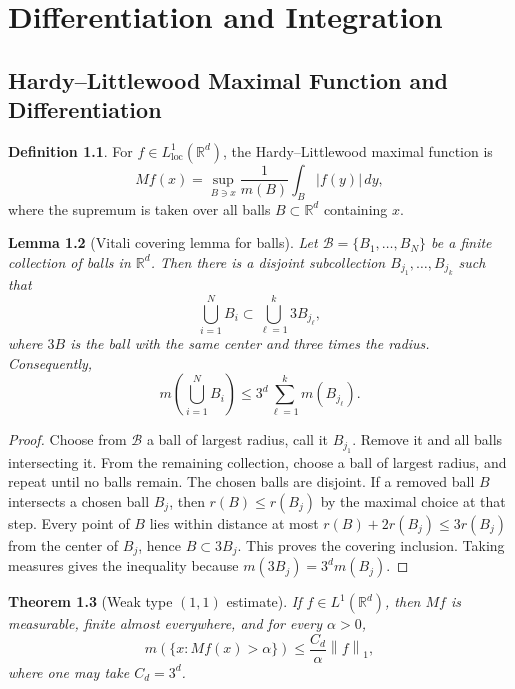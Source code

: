 \documentclass[11pt,openany]{book}
\numberwithin{equation}{chapter}
\theoremstyle{definition}
\newtheorem{definition}{Definition}[chapter]
\theoremstyle{plain}
\newtheorem{theorem}[definition]{Theorem}
\newtheorem{lemma}[definition]{Lemma}
\theoremstyle{remark}
\newcommand{\R}{\mathbb{R}}
\newcommand{\1}{\mathbf{1}}
\newcommand{\dd}{\,d}
\newcommand{\abs}[1]{\left\lvert #1\right\rvert}
\newcommand{\norm}[1]{\left\lVert #1\right\rVert}
\begin{document}
\chapter{Differentiation and Integration}

\section{Hardy--Littlewood Maximal Function and Differentiation}

\begin{definition}
For \(f\in L^1_{\mathrm{loc}}(\R^d)\), the Hardy--Littlewood maximal function is
\[
    Mf(x)=\sup_{B\ni x}\frac1{m(B)}\int_B\abs{f(y)}\dd y,
\]
where the supremum is taken over all balls \(B\subset\R^d\) containing \(x\).
\end{definition}

\begin{lemma}[Vitali covering lemma for balls]
Let \(\mathcal B=\{B_1,\ldots,B_N\}\) be a finite collection of balls in \(\R^d\).  Then there is a disjoint subcollection \(B_{j_1},\ldots,B_{j_k}\) such that
\[
    \bigcup_{i=1}^N B_i\subset \bigcup_{\ell=1}^k 3B_{j_\ell},
\]
where \(3B\) is the ball with the same center and three times the radius.  Consequently,
\[
    m\left(\bigcup_{i=1}^N B_i\right)\le 3^d\sum_{\ell=1}^k m(B_{j_\ell}).
\]
\end{lemma}

\begin{proof}
Choose from \(\mathcal B\) a ball of largest radius, call it \(B_{j_1}\).  Remove it and all balls intersecting it.  From the remaining collection, choose a ball of largest radius, and repeat until no balls remain.  The chosen balls are disjoint.  If a removed ball \(B\) intersects a chosen ball \(B_j\), then \(r(B)\le r(B_j)\) by the maximal choice at that step.  Every point of \(B\) lies within distance at most \(r(B)+2r(B_j)\le3r(B_j)\) from the center of \(B_j\), hence \(B\subset3B_j\).  This proves the covering inclusion.  Taking measures gives the inequality because \(m(3B_j)=3^d m(B_j)\).
\end{proof}

\begin{theorem}[Weak type \((1,1)\) estimate]
If \(f\in L^1(\R^d)\), then \(Mf\) is measurable, finite almost everywhere, and for every \(\alpha>0\),
\[
    m(\{x:Mf(x)>\alpha\})\le \frac{C_d}{\alpha}\norm f_1,
\]
where one may take \(C_d=3^d\).
\end{theorem}
\end{document}
